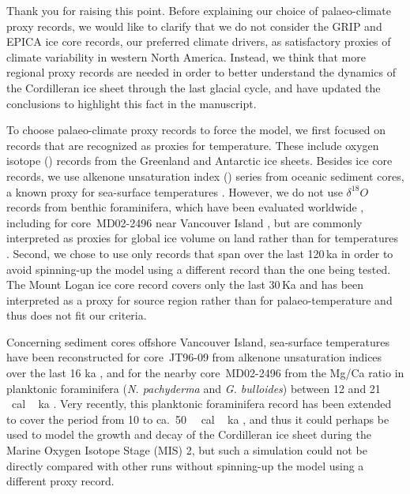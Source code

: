 Thank you for raising this point. Before explaining our choice of
palaeo-climate proxy records, we would like to clarify that we do not consider
the GRIP and EPICA ice core records, our preferred climate drivers, as
satisfactory proxies of climate variability in western North America. Instead,
we think that more regional proxy records are needed in order to better
understand the dynamics of the Cordilleran ice sheet through the last glacial
cycle, and have updated the conclusions to highlight this fact in the
manuscript.

To choose palaeo-climate proxy records to force the model, we first focused on
records that are recognized as proxies for temperature. These include oxygen
isotope () records from the Greenland and Antarctic ice
sheets. Besides ice core records, we use alkenone unsaturation index
() series from oceanic sediment cores, a known proxy for
sea-surface temperatures \citep{Prahl.Wakeham.1987, Prahl.etal.1988,
Muller.etal.1998}. However, we do not use $\delta^{18}O$ records from benthic
foraminifera, which have been evaluated worldwide \citep{Lisiecki.Raymo.2005},
including for core~MD02-2496 near Vancouver Island \citep{Cosma.etal.2008}, but
are commonly interpreted as proxies for global ice volume on land rather than
for temperatures \citep{Shackleton.1967}. Second, we chose to use only records
that span over the last 120\,ka in order to avoid spinning-up the model using a
different record than the one being tested. The Mount Logan ice core
 record covers only the last 30\,Ka and has been interpreted
as a proxy for source region rather than for palaeo-temperature
\citep{Fisher.etal.2004, Fisher.etal.2008} and thus does not fit our criteria.

Concerning sediment cores offshore Vancouver Island, sea-surface temperatures
have been reconstructed for core~JT96-09 from alkenone unsaturation indices
over the last 16 ka \citep{Kienast.McKay.2001}, and for the nearby
core~MD02-2496 from the Mg/Ca ratio in planktonic foraminifera (\emph{N.
pachyderma} and \emph{G. bulloides}) between 12 and
21\,\unit{\,cal\,ka} \citep{Taylor.etal.2014}. Very recently, this
planktonic foraminifera record has been extended to cover the period from 10 to
ca.~50\,\unit{\,cal\,ka} \citep{Taylor.etal.2015}, and thus it
could perhaps be used to model the growth and decay of the Cordilleran ice
sheet during
the Marine Oxygen Isotope Stage (MIS) 2, but such a simulation could not be
directly compared with other runs without spinning-up the model using a
different proxy record.

